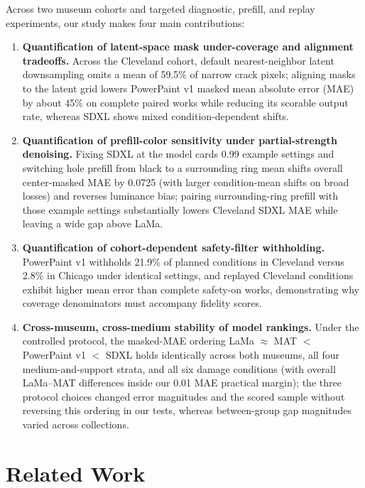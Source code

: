\documentclass[fleqn,12pt,lineno]{wlpeerj}
\providecommand{\tightlist}{\setlength{\itemsep}{0pt}\setlength{\parskip}{0pt}}
\begin{document}
Across two museum cohorts and targeted diagnostic, prefill, and replay experiments, our study makes four main contributions:

\begin{enumerate}
\def\labelenumi{\arabic{enumi}.}
\tightlist
\item
  \textbf{Quantification of latent-space mask under-coverage and alignment tradeoffs.} Across the Cleveland cohort, default nearest-neighbor latent downsampling omits a mean of 59.5\% of narrow crack pixels; aligning masks to the latent grid lowers PowerPaint v1 masked mean absolute error (MAE) by about 45\% on complete paired works while reducing its scorable output rate, whereas SDXL shows mixed condition-dependent shifts.
\item
  \textbf{Quantification of prefill-color sensitivity under partial-strength denoising.} Fixing SDXL at the model card\textquotesingle s 0.99 example settings and switching hole prefill from black to a surrounding ring mean shifts overall center-masked MAE by 0.0725 (with larger condition-mean shifts on broad losses) and reverses luminance bias; pairing surrounding-ring prefill with those example settings substantially lowers Cleveland SDXL MAE while leaving a wide gap above LaMa.
\item
  \textbf{Quantification of cohort-dependent safety-filter withholding.} PowerPaint v1 withholds 21.9\% of planned conditions in Cleveland versus 2.8\% in Chicago under identical settings, and replayed Cleveland conditions exhibit higher mean error than complete safety-on works, demonstrating why coverage denominators must accompany fidelity scores.
\item
  \textbf{Cross-museum, cross-medium stability of model rankings.} Under the controlled protocol, the masked-MAE ordering LaMa \(\approx\) MAT \(\!<\!\) PowerPaint v1 \(\!<\!\) SDXL holds identically across both museums, all four medium-and-support strata, and all six damage conditions (with overall LaMa--MAT differences inside our 0.01 MAE practical margin); the three protocol choices changed error magnitudes and the scored sample without reversing this ordering in our tests, whereas between-group gap magnitudes varied across collections.
\end{enumerate}

\section{Related Work}\label{related-work}
\end{document}
